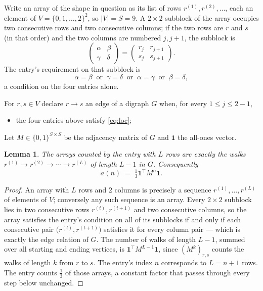 \documentclass[11pt,a4paper]{article}
\theoremstyle{plain}
\newtheorem{lemma}[theorem]{Lemma}
\theoremstyle{definition}
\begin{document}
Write an array of the shape in question as its list of rows
$r^{(1)},r^{(2)},\dots$, each an element of
$V=\{0,1,\dots,2\}^{2}$, so $|V|=S=9$. A $2\times2$ subblock of the array
occupies two consecutive rows and two consecutive columns; if the two rows are $r$
and $s$ (in that order) and the two columns are numbered $j,j+1$,
the subblock is
\[
\begin{pmatrix}\alpha&\beta\\\gamma&\delta\end{pmatrix}=\begin{pmatrix}r_j&r_{j+1}\\s_j&s_{j+1}\end{pmatrix}.
\]
The entry's requirement on that subblock is
\begin{equation}\label{eq:loc}
\alpha=\beta\ \text{ or }\ \gamma=\delta\ \text{ or }\ \alpha=\gamma\ \text{ or }\ \beta=\delta,
\end{equation}
a condition on the four entries alone.

For $r,s\in V$ declare $r\to s$ an edge of a digraph $G$ when, for every
$1\le j\le 2-1$,
\begin{itemize}
\item the four entries above satisfy \eqref{eq:loc};

\end{itemize}
Let $M\in\{0,1\}^{S\times S}$ be the adjacency matrix of $G$ and $\mathbf{1}$ the
all-ones vector.

\begin{lemma}\label{lem:walk}
The arrays counted by the entry with $L$ rows are exactly the walks
$r^{(1)}\to r^{(2)}\to\cdots\to r^{(L)}$ of length $L-1$ in $G$. Consequently
\[
a(n)\;=\;\tfrac1{3}\mathbf{1}^{\!\top}M^{n}\mathbf{1} .
\]
\end{lemma}

\begin{proof}
An array with $L$ rows and $2$ columns is precisely a sequence
$r^{(1)},\dots,r^{(L)}$ of elements of $V$; conversely any such sequence is an array.
Every $2\times2$ subblock lies in two consecutive rows $r^{(t)},r^{(t+1)}$ and two
consecutive columns, so the array satisfies the entry's condition on all of its subblocks
if and only if each consecutive pair $\bigl(r^{(t)},r^{(t+1)}\bigr)$ satisfies it for
every column pair --- which is exactly the edge relation of $G$. The number of walks of
length $L-1$, summed over all starting and ending vertices, is
$\mathbf{1}^{\!\top}M^{L-1}\mathbf{1}$, since $(M^{k})_{r,s}$ counts the walks of
length $k$ from $r$ to $s$. The entry's index $n$ corresponds to $L=n+1$ rows. The entry counts $\tfrac1{3}$ of those arrays, a constant factor that passes through every step below unchanged.
\end{proof}
\end{document}
